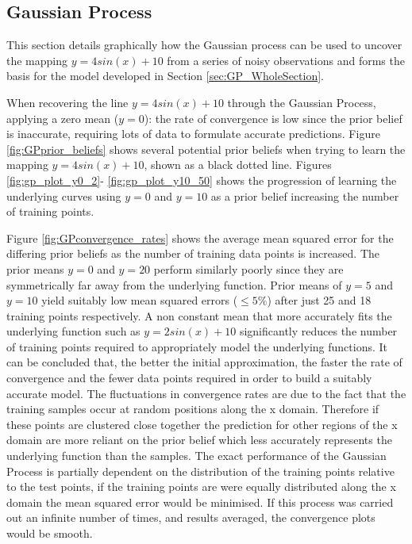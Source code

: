 \subsection{Gaussian Process} %

\label{appendix:gp_explained} %


This section details graphically how the Gaussian process can be used to uncover the mapping $y=4sin(x)+10$ from a series of noisy  observations and forms the basis for the model developed in Section \ref{sec:GP_WholeSection}. 



When recovering the line $y=4sin(x)+10$ through the Gaussian Process, applying a zero mean ($y=0$): the rate of convergence is low since the prior belief is inaccurate, requiring lots of data to formulate accurate predictions. Figure \ref{fig:GPprior_beliefs} shows several potential prior beliefs when trying to learn the mapping $y=4sin(x)+10$, shown as a black dotted line. Figures \ref{fig:gp_plot_y0_2}- \ref{fig:gp_plot_y10_50} shows the progression of learning the underlying curves using $y=0$ and $y=10$ as a prior belief increasing the number of training points.

Figure \ref{fig:GPconvergence_rates} shows the average mean squared error for the differing prior beliefs as the number of training data points is increased. The prior means $y=0$ and $y=20$ perform similarly poorly since they are symmetrically far away from the underlying function. Prior means of $y=5$ and $y=10$ yield suitably low mean squared errors ($\leq5\%$) after just 25 and 18 training points respectively. A non constant mean that more accurately fits the underlying function such as $y=2sin(x)+10$ significantly reduces the number of training points required to appropriately model the underlying functions. It can be concluded that, the better the initial approximation, the faster the rate of convergence and the fewer data points required in order to build a suitably accurate model. The fluctuations in convergence rates are due to the fact that the training samples occur at random positions along the x domain. Therefore if these points are clustered close together the prediction for other regions of the x domain are more reliant on the prior belief which less accurately represents the underlying function than the samples. The exact performance of the Gaussian Process is partially dependent on the distribution of the training points relative to the test points, if the training points are were equally distributed along the x domain the mean squared error would be minimised. If this process was carried out an infinite number of times, and results averaged, the convergence plots would be smooth.

